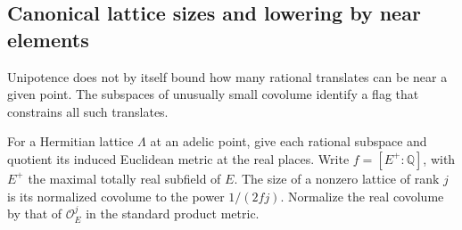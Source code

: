 \subsection{Canonical lattice sizes and lowering by near elements}

Unipotence does not by itself bound how many rational translates can be near a given point. The subspaces of unusually small covolume identify a flag that constrains all such translates.

For a Hermitian lattice \(\Lambda\) at an adelic point,
give each rational subspace and quotient its induced
Euclidean metric at the real places. Write \(f=[E^+:\mathbb Q]\), with \(E^+\) the maximal totally real subfield of \(E\). The size of a nonzero lattice of rank \(j\) is its normalized covolume to the power \(1/(2fj)\). Normalize the real covolume by that of
\(\mathcal O_E^j\) in the standard product metric.

